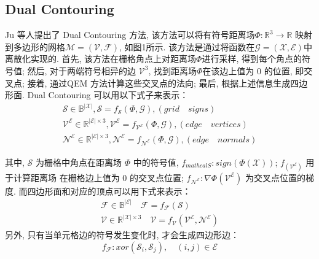 \subsection{Dual Contouring}
Ju 等人\cite{ju2002dual}提出了 Dual Contouring 方法, 该方法可以将有符号距离场$\Phi:\mathbb{R}^3\rightarrow \mathbb{R}$ 映射到多边形的网格$\mathcal{M=(V,F)}$, 如图1所示. 该方法是通过将函数在$\mathcal{G=(X,E)}$中离散化实现的. 首先, 该方法在栅格角点上对距离场$\Phi$进行采样, 得到每个角点的符号值; 然后, 对于两端符号相异的边 $\mathcal{V}^3$, 找到距离场$\Phi$在该边上值为 0 的位置, 即交叉点; 接着, 通过QEM 方法计算这些交叉点的法向; 最后, 根据上述信息生成四边形面. Dual Contouring 可以用以下式子来表示：\\
\begin{align}\label{a}
\mathcal{S}\in \mathbb{B}^{|\mathcal{X}|},  \mathcal{S}=f_{\mathcal{S}}(\Phi,\mathcal{G}),  (grid \quad signs) \\
\mathcal{V}^\mathcal{E}\in\mathbb{R}^{|\mathcal{E}|\times 3}, \mathcal{V}^\mathcal{E}=f_{\mathcal{V}^\mathcal{E}}(\Phi,\mathcal{G}), (edge\quad vertices)\\
\mathcal{N}^\mathcal{E}\in\mathbb{R}^{|\mathcal{E}|\times 3},
\mathcal{N}^\mathcal{E}=f_{\mathcal{N}^\mathcal{E}}(\Phi,\mathcal{G}), (edge\quad normals)
\end{align}


其中, $\mathcal{S}$ 为栅格中角点在距离场 $\Phi$ 中的符号值, $ f_{mathcal{S}}: sign(\Phi(\mathcal{X}))$; $f_(\mathcal{V}^\mathcal{E})$ 用于计算距离场 在栅格边上值为 0 的交叉点位置; $f_\mathcal{N^E}:\nabla \Phi(\mathcal{V^E})$  为交叉点位置的梯度. 而四边形面和对应的顶点可以用下式来表示：
\begin{align}
    \mathcal{F}\in \mathbb{B}^{|\mathcal{E}|} \quad \mathcal{F}=f_{\mathcal{F}}(\mathcal{S}) \\
    \mathcal{V} \in \mathbb{R}^{|\mathcal{X}| \times 3} \quad \mathcal{V}=f_{\mathcal{V}}(\mathcal{V}^{\mathcal{E}}, \mathcal{N}^{\mathcal{E}})
\end{align}
另外, 只有当单元格边的符号发生变化时, 才会生成四边形边：
\begin{equation}
    f_{\mathcal{F}}:xor(\mathcal{S}_i, \mathcal{S}_j), \quad (i, j)\in \mathcal{E}
\end{equation}

